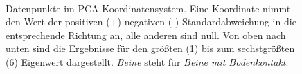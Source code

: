\begin{figure}
   \\
   \qquad
   
   \caption{Datenpunkte im PCA-Koordinatensystem. Eine Koordinate nimmt den Wert der positiven (+) \bzw negativen (-) Standardabweichung in die entsprechende Richtung an, alle anderen sind null. Von oben nach unten sind die Ergebnisse für den größten (1) bis zum sechstgrößten (6) Eigenwert dargestellt. \emph{Beine} steht für \emph{Beine mit Bodenkontakt}.}
   \label{pca_results_sqrtEV}
  \end{figure}
